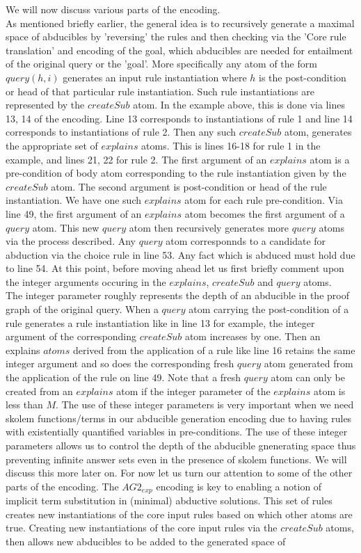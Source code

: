 \documentclass{article}
\begin{document}
We will now discuss various parts of the encoding.\\
\newline
As mentioned briefly earlier, the general idea is to recursively generate a maximal space of abducibles by 'reversing' the rules and then checking via the 'Core rule translation' and encoding of the goal, which abducibles are needed for entailment of the original query or the 'goal'. More specifically any atom of the form $query(h,i)$ generates an input rule instantiation where $h$ is the post-condition or head of that particular rule instantiation. Such rule instantiations are represented by the $createSub$ atom. In the example above, this is done via lines 13, 14 of the encoding. Line 13 corresponds to instantiations of rule 1 and line 14 corresponds to instantiations of rule 2. Then any such $createSub$ atom, generates the appropriate set of $explains$ atoms. This is lines 16-18 for rule 1 in the example, and lines 21, 22 for rule 2. The first argument of an $explains$ atom is a pre-condition of body atom corresponding to the rule instantiation given by the $createSub$ atom. The second argument is post-condition or head of the rule instantiation. We have one such $explains$ atom for each rule pre-condition. Via line 49, the first argument of an $explains$ atom becomes the first argument of a $query$ atom. This new $query$ atom then recursively generates more $query$ atoms via the process described. Any $query$ atom corresponnds to a candidate for abduction via the choice rule in line 53. Any fact which is abduced must hold due to line 54. At this point, before moving ahead let us first briefly comment upon the integer arguments occuring in the $explains$, $createSub$ and $query$ atoms.\\ The integer parameter roughly represents the depth of an abducible in the proof graph of the original query. When a $query$ atom carrying the post-condition of a rule generates a rule instantiation like in line 13 for example, the integer argument of the corresponding $createSub$ atom increases by one. Then an explains $atoms$ derived from the application of a rule like line 16 retains the same integer argument and so does the corresponding fresh $query$ atom generated from the application of the rule on line 49. Note that a fresh $query$ atom can only be created from an $explains$ atom if the integer parameter of the $explains$ atom is less than $M$. The use of these integer parameters is very important when we need skolem functions/terms in our abducible generation encoding due to having rules with existentially quantified variables in pre-conditions. The use of these integer parameters allows us to control the depth of the abducible gnenerating space thus preventing infinite answer sets even in the presence of skolem functions. We will discuss this more later on. For now let us turn our attention to some of the other parts of the encoding. The $AG2_{exp}$ encoding is key to enabling a notion of implicit term substitution in (minimal) abductive solutions. This set of rules creates new instantiations of the core input rules based on which other atoms are true. Creating new instantiations of the core input rules via the $createSub$ atoms, then allows new abducibles to be added to the generated space of 
\end{document}
